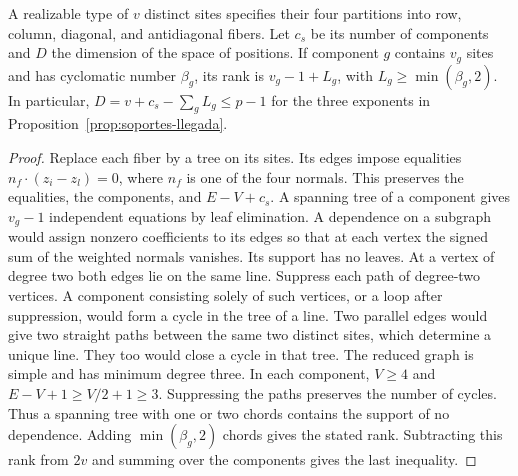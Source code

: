 \begin{lema}\label{lem:rango-llegada}
A realizable type of \(v\) distinct sites specifies their four partitions into row, column, diagonal, and
antidiagonal fibers. Let \(c_s\) be its number of components and \(D\) the dimension of the space of
positions. If component \(g\) contains \(v_g\) sites and has cyclomatic number \(\beta_g\), its rank is
\(v_g-1+L_g\), with \(L_g\ge\min(\beta_g,2)\). In particular, \(D=v+c_s-\sum_gL_g\le p-1\) for the three
exponents in Proposition~\ref{prop:soportes-llegada}.
\end{lema}
\begin{proof}
Replace each fiber by a tree on its sites. Its edges impose equalities \(n_f\cdot(z_i-z_l)=0\), where
\(n_f\) is one of the four normals. This preserves the equalities, the components, and \(E-V+c_s\). A
spanning tree of a component gives \(v_g-1\) independent equations by leaf elimination. A dependence on a
subgraph would assign nonzero coefficients to its edges so that at each vertex the signed sum of the
weighted normals vanishes. Its support has no leaves. At a vertex of degree two both edges lie on the
same line. Suppress each path of degree-two vertices. A component consisting solely of such vertices, or
a loop after suppression, would form a cycle in the tree of a line. Two parallel edges would give two
straight paths between the same two distinct sites, which determine a unique line. They too would close a
cycle in that tree. The reduced graph is simple and has minimum degree three. In each component,
\(V\ge4\) and \(E-V+1\ge V/2+1\ge3\). Suppressing the paths preserves the number of cycles. Thus a
spanning tree with one or two chords contains the support of no dependence. Adding \(\min(\beta_g,2)\)
chords gives the stated rank. Subtracting this rank from \(2v\) and summing over the components gives the
last inequality.
\end{proof}

